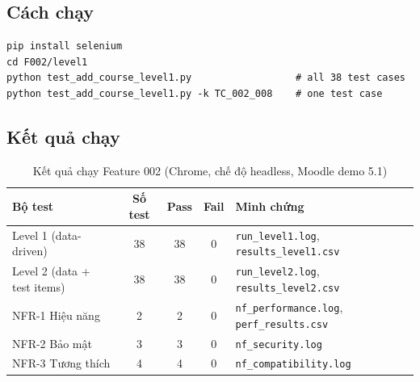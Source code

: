 \subsection{Cách chạy}
\begin{lstlisting}
pip install selenium
cd F002/level1
python test_add_course_level1.py                  # all 38 test cases
python test_add_course_level1.py -k TC_002_008    # one test case
\end{lstlisting}

\subsection{Kết quả chạy}
\begin{table}[H]\centering\small
\begin{tabular}{|L{4.6cm}|c|c|c|L{4.2cm}|}\hline
{}\textbf{Bộ test} & \textbf{Số test} & \textbf{Pass} & \textbf{Fail} & \textbf{Minh chứng} \\ \hline
Level 1 (data-driven) & 38 & 38 & 0 & \texttt{run\_level1.log}, \texttt{results\_level1.csv} \\ \hline
Level 2 (data + test items) & 38 & 38 & 0 & \texttt{run\_level2.log}, \texttt{results\_level2.csv} \\ \hline
NFR-1 Hiệu năng & 2 & 2 & 0 & \texttt{nf\_performance.log}, \texttt{perf\_results.csv} \\ \hline
NFR-2 Bảo mật & 3 & 3 & 0 & \texttt{nf\_security.log} \\ \hline
NFR-3 Tương thích & 4 & 4 & 0 & \texttt{nf\_compatibility.log} \\ \hline
\end{tabular}\caption{Kết quả chạy Feature 002 (Chrome, chế độ headless, Moodle demo 5.1)}\end{table}

